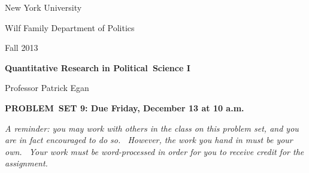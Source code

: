 \documentclass[11pt]{article}
\begin{document}
New York University

Wilf Family Department of Politics

Fall 2013

\begin{center}
{\large \textbf{Quantitative Research in Political\ Science I}}

Professor Patrick Egan

\bigskip

\textbf{PROBLEM\ SET 9: Due Friday, December 13 at 10 a.m.}
\end{center}

\textit{A reminder: you may work with others in the class on this problem
set, and you are in fact encouraged to do so. \ However, the work you hand
in must be your own. \ Your work must be word-processed in order for you to
receive credit for the assignment.}
\end{document}
